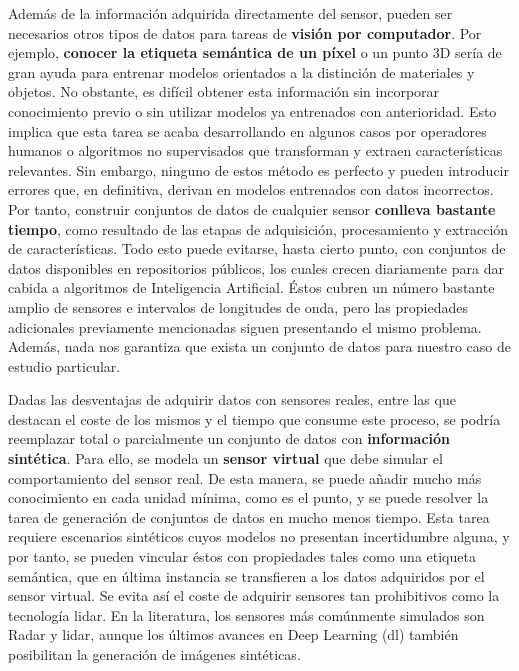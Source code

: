 Además de la información adquirida directamente del sensor, pueden ser necesarios otros tipos de datos para tareas de \textbf{visión por computador}. Por ejemplo, \textbf{conocer la etiqueta semántica de un píxel} o un punto 3D sería de gran ayuda para entrenar modelos orientados a la distinción de materiales y objetos. No obstante, es difícil obtener esta información sin incorporar conocimiento previo o sin utilizar modelos ya entrenados con anterioridad. Esto implica que esta tarea se acaba desarrollando en algunos casos por operadores humanos o algoritmos no supervisados que transforman y extraen características relevantes. Sin embargo, ninguno de estos método es perfecto y pueden introducir errores que, en definitiva, derivan en modelos entrenados con datos incorrectos. Por tanto, construir conjuntos de datos de cualquier sensor \textbf{conlleva bastante tiempo}, como resultado de las etapas de adquisición, procesamiento y extracción de características. Todo esto puede evitarse, hasta cierto punto, con conjuntos de datos disponibles en repositorios públicos, los cuales crecen diariamente para dar cabida a algoritmos de Inteligencia Artificial. Éstos cubren un número bastante amplio de sensores e intervalos de longitudes de onda, pero las propiedades adicionales previamente mencionadas siguen presentando el mismo problema. Además, nada nos garantiza que exista un conjunto de datos para nuestro caso de estudio particular.

Dadas las desventajas de adquirir datos con sensores reales, entre las que destacan el coste de los mismos y el tiempo que consume este proceso, se podría reemplazar total o parcialmente un conjunto de datos con \textbf{información sintética}. Para ello, se modela un \textbf{sensor virtual} que debe simular el comportamiento del sensor real. De esta manera, se puede añadir mucho más conocimiento en cada unidad mínima, como es el punto, y se puede resolver la tarea de generación de conjuntos de datos en mucho menos tiempo. Esta tarea requiere escenarios sintéticos cuyos modelos no presentan incertidumbre alguna, y por tanto, se pueden vincular éstos con propiedades tales como una etiqueta semántica, que en última instancia se transfieren a los datos adquiridos por el sensor virtual. Se evita así el coste de adquirir sensores tan prohibitivos como la tecnología \acrshort{lidar}. En la literatura, los sensores más comúnmente simulados son Radar y \acrshort{lidar}, aunque los últimos avances en Deep Learning (\acrshort{dl}) también posibilitan la generación de imágenes sintéticas.

